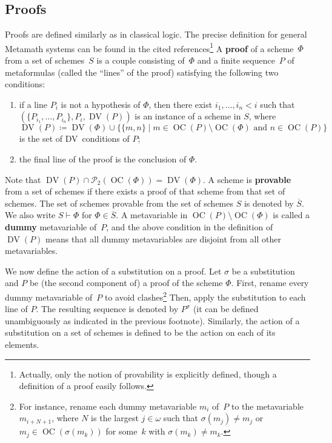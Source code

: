 \documentclass[11pt]{article}
\newcommand*{\define}[1]{\textbf{#1}}%
\newcommand*{\calP}{\mathcal{P}}
\DeclareMathOperator{\DV}{DV}
\DeclareMathOperator{\OC}{OC}
\theoremstyle{plain}
\theoremstyle{definition}
\theoremstyle{remark}
\begin{document}
\subsection{Proofs}

Proofs are defined similarly as in classical logic.
The precise definition for general Metamath systems can be found in the cited
references\footnote{
Actually, only the notion of provability is explicitly defined, though a definition of a proof
easily follows.}
A \define{proof} of a scheme~$\Phi$ from a set of schemes~$S$ is a couple consisting of~$\Phi$
and a finite sequence~$P$ of metaformulas (called the ``lines'' of the proof) satisfying the
following two conditions:
\begin{enumerate}
\item
if a line $P_i$ is not a hypothesis of $\Phi$, then there exist $i_1, \dots, i_n < i$ such that
$(\{P_{i_1}, \dots, P_{i_n}\}, P_i, \DV(P))$ is an instance of a scheme in $S$, where
\begin{equation}
\DV(P) \coloneqq \DV(\Phi) \cup \bigl\{ \{m, n\} \mid m \in \OC(P) \setminus \OC(\Phi)
\text{ and } n \in \OC(P) \bigr\}
\end{equation}
is the set of DV~conditions of $P$;
\item
the final line of the proof is the conclusion of $\Phi$.
\end{enumerate}
Note that $\DV(P) \cap \calP_2(\OC(\Phi)) = \DV(\Phi)$.
A scheme is \define{provable} from a set of schemes if there exists a proof of that scheme from
that set of schemes.
The set of schemes provable from the set of schemes $S$ is denoted by $\overline{S}$.
We also write $S \vdash \Phi$ for $\Phi \in \overline{S}$.
A metavariable in $\OC(P) \setminus \OC(\Phi)$ is called a \define{dummy} metavariable of~$P$,
and the above condition in the definition of $\DV(P)$ means that all dummy metavariables are
disjoint from all other metavariables.

We now define the action of a substitution on a proof.
Let $\sigma$ be a substitution and $P$ be (the second component of) a proof of the scheme $\Phi$.
First, rename every dummy metavariable of~$P$ to avoid clashes\footnote{For instance,
rename each dummy metavariable $m_i$ of~$P$ to the metavariable $m_{i+N+1}$, where $N$ is the
largest $j \in \omega$ such that $\sigma(m_j) \neq m_j$ or $m_j \in \OC(\sigma(m_k))$ for
some~$k$ with $\sigma(m_k) \neq m_k$.}
Then, apply the substitution to each line of $P$.
The resulting sequence is denoted by $P^\sigma$ (it can be defined unambiguously as indicated in
the previous footnote).
Similarly, the action of a substitution on a set of schemes is defined to be the action on each
of its elements.
\end{document}
